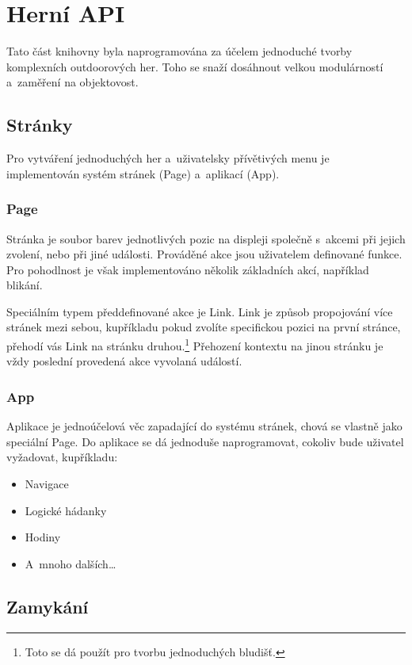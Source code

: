 \chapter{Herní API}
Tato část knihovny byla naprogramována za účelem jednoduché tvorby komplexních outdoorových her.
Toho se snaží dosáhnout velkou modulárností a~zaměření na objektovost.

\section{Stránky}

Pro vytváření jednoduchých her a~uživatelsky přívětivých menu je implementován systém stránek (Page) a~aplikací (App).

\subsection{Page}

Stránka je soubor barev jednotlivých pozic na displeji společně s~akcemi při jejich zvolení, nebo při jiné události.
Prováděné akce jsou uživatelem definované funkce.
Pro pohodlnost je však implementováno několik základních akcí, například blikání.

Speciálním typem předdefinované akce je Link.
Link je způsob propojování více stránek mezi sebou, kupříkladu pokud zvolíte specifickou pozici na první stránce, přehodí vás Link na stránku druhou.\footnote{Toto se dá použít pro tvorbu jednoduchých bludišť.}
Přehození kontextu na jinou stránku je vždy poslední provedená akce vyvolaná událostí.

\subsection{App}

Aplikace je jednoúčelová věc zapadající do systému stránek, chová se vlastně jako speciální Page.
Do aplikace se dá jednoduše naprogramovat, cokoliv bude uživatel vyžadovat, kupříkladu:
\begin{itemize}
    \item Navigace
    \item Logické hádanky
    \item Hodiny
    \item A~mnoho dalších\dots
\end{itemize}

\section{Zamykání}

